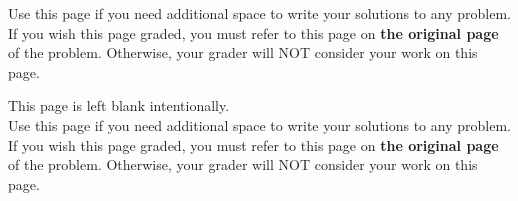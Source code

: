 \documentclass[11pt]{article}
\begin{document}
\begin{enumerate}
Use this page if you need additional space to write your solutions to any problem. \\

If you wish this page graded, you must refer to this page on \textbf{the original page} of the problem. Otherwise, your grader will NOT consider your work on this page.

\newpage

This page is left blank intentionally.\\

Use this page if you need additional space to write your solutions to any problem. \\

If you wish this page graded, you must refer to this page on \textbf{the original page} of the problem. Otherwise, your grader will NOT consider your work on this page.

\end{enumerate}
\end{document}

